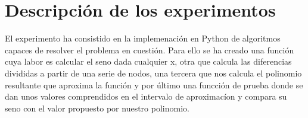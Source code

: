 \section{Descripción de los experimentos}
\label{3:sec:1}
El experimento ha consistido en la implemenación en Python de algoritmos capaces de resolver el problema en cuestión. Para ello se ha creado una función cuya labor es calcular el seno dada cualquier x, otra que calcula las diferencias divididas a partir de una serie de nodos, una tercera que nos calcula el polinomio resultante que aproxima la función y por último una funcción de prueba donde se dan unos valores comprendidos en el intervalo de aproximacíon y compara su seno con el valor propuesto por nuestro polinomio.

